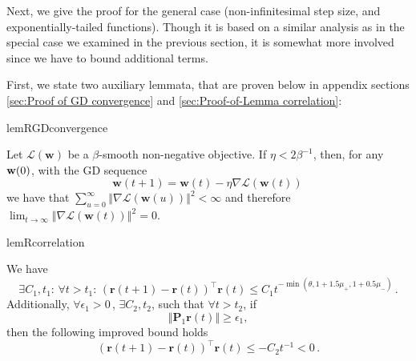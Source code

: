 \documentclass[twoside,11pt,english]{article}
\begin{document}
Next, we give the proof for the general case (non-infinitesimal step size, and exponentially-tailed
functions). Though it is based on a similar analysis as in the special
case we examined in the previous section, it is somewhat more involved
since we have to bound additional terms.

First, we state two auxiliary lemmata, that are proven below in appendix
sections \ref{sec:Proof of GD convergence} and \ref{sec:Proof-of-Lemma correlation}:

\begin{restatable}{lemR}{GDconvergence}

\label{lem: GD convergence} Let $\mathcal{L}\left(\mathbf{w}\right)$
be a $\beta$-smooth non-negative objective. If $\eta<2\beta^{-1}$,
then, for any $\mathbf{w}(0)$, with the GD sequence 
\begin{equation}
\mathbf{w}\left(t+1\right)=\mathbf{w}\left(t\right)-\eta\nabla\mathcal{L}\left(\mathbf{w}(t)\right)\,\label{eq: gradient descent}
\end{equation}
we have that $\sum_{u=0}^{\infty}\left\Vert \nabla\mathcal{L}\left(\mathbf{w}\left(u\right)\right)\right\Vert ^{2}<\infty$
and therefore $\lim_{t\rightarrow\infty}\left\Vert \nabla\mathcal{L}\left(\mathbf{w}\left(t\right)\right)\right\Vert ^{2}=0.$

\end{restatable}

\begin{restatable}{lemR}{correlation}

\label{lem: correlation bound} We have 
\begin{equation}
\exists C_{1},t_{1}:\,\forall t>t_{1}:\,\left(\mathbf{r}\left(t+1\right)-\mathbf{r}\left(t\right)\right)^{\top}\mathbf{r}\left(t\right)\leq C_{1}t^{-\min\left(\theta,1+1.5\mu_{+},1+0.5\mu_{-}\right)}\,.\label{eq: general case}
\end{equation}
Additionally, $\forall\epsilon_{1}>0\,$, $\exists C_{2},t_{2}$,
such that $\forall t>t_{2}$, if 
\begin{equation}
\left\Vert \mathbf{P}_{1}\mathbf{r}\left(t\right)\right\Vert \geq\epsilon_{1},\label{eq: bounded r(t)}
\end{equation}
then the following improved bound holds 
\begin{equation}
\left(\mathbf{r}\left(t+1\right)-\mathbf{r}\left(t\right)\right)^{\top}\mathbf{r}\left(t\right)\leq-C_{2}t^{-1}<0\,.\label{eq: bounded cases}
\end{equation}

\end{restatable}
\end{document}
